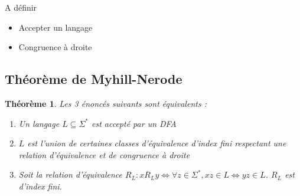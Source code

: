 \documentclass[french,letterpaper, 12pt]{article}
\newtheorem{theorem}{Théorème}[section]
\begin{document}
	 A définir
	 \begin{itemize}
	 	\item Accepter un langage
	 	\item Congruence à droite
	 \end{itemize}
	 
	\subsection{Théorème de Myhill-Nerode}
	
	\begin{theorem}
		Les 3 énoncés suivants sont équivalents :
		\begin{enumerate}
			\item Un langage $L\subseteq\Sigma^*$ est accepté par un DFA
			\item $L$ est l'union de certaines classes d'équivalence d'index fini respectant une relation d'équivalence et de congruence à droite
			\item Soit la relation d'équivalence $R_L : xR_Ly \Leftrightarrow \forall z \in \Sigma^*, xz \in L \Leftrightarrow yz \in L$. $R_L$ est d'index fini.
		\end{enumerate}
	\end{theorem}
	
\end{document}
